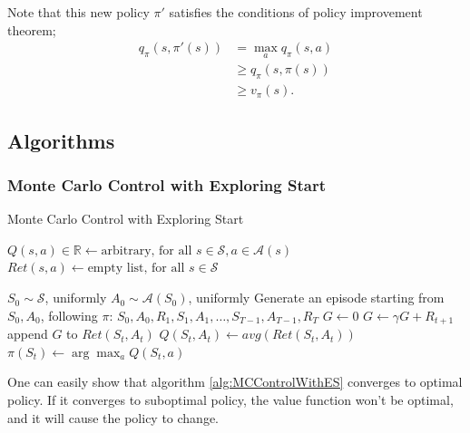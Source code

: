 \documentclass[../../main.tex]{subfiles}
\begin{document}
        Note that this new policy $\pi'$ satisfies the conditions of policy improvement theorem;
        \begin{align}
            q_{\pi}(s, \pi'(s)) &= \max_a{q_{\pi}(s,a)} \\
            &\geq q_{\pi}(s, \pi(s)) \\
            &\geq v_\pi(s).
        \end{align}

    \subsection{Algorithms}
        \subsubsection{Monte Carlo Control with Exploring Start}
            {Monte Carlo Control with Exploring Start}
            {}
            { \\
            }
            {
                $Q(s,a) \in \mathbb{R} \leftarrow \text{arbitrary, for all } s \in \mathcal{S}, a \in \mathcal{A}(s)$\;
                $Ret(s,a) \leftarrow \text{empty list, for all } s \in \mathcal{S}$\;

                {
                    $S_0 \sim \mathcal{S}$, uniformly\;
                    $A_0 \sim \mathcal{A}(S_0)$, uniformly\;
                    Generate an episode starting from $S_0,A_0$, following $\pi$: $S_0,A_0,R_1,S_1,A_1,\dots,S_{T-1},A_{T-1},R_T$\;
                    $G \leftarrow 0$\;
                    {
                        $G \leftarrow \gamma G + R_{t+1}$\;
                        {
                            append $G$ to $Ret(S_t,A_t)$\;
                            $Q(S_t,A_t) \leftarrow avg(Ret(S_t,A_t))$\;
                            $\pi(S_t) \leftarrow \arg\max_a{Q(S_t,a)}$\;
                        }
                    }
                }
            }
            One can easily show that algorithm \ref{alg:MCControlWithES} converges to optimal policy. If it converges to suboptimal policy, the value function won't be optimal,
            and it will cause the policy to change.
        
\end{document}
